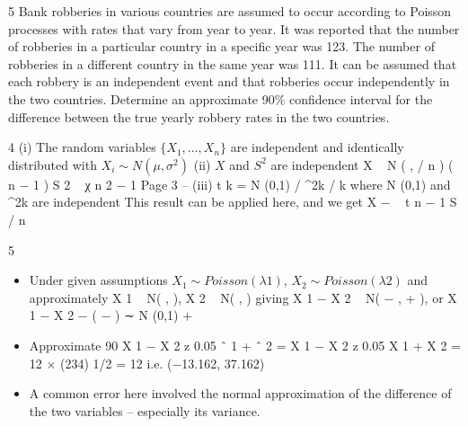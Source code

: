 \documentclass[a4paper,12pt]{article}
\begin{document}

\item 5
Bank robberies in various countries are assumed to occur according to Poisson
processes with rates that vary from year to year. It was reported that the number of robberies in a particular country in a specific year was 123. The number of robberies
in a different country in the same year was 111. It can be assumed that each robbery is an independent event and that robberies occur independently in the two countries.
Determine an approximate 90\% confidence interval for the difference between the true yearly robbery rates in the two countries.


4
(i)
The random variables $\{ X_1 , \ldots, X_n\}$  are independent
and identically distributed with $X_i \sim N ( \mu , \sigma^2 )$
(ii)
$X$ and $S^2$ are independent
X ~ N ( \mu ,  / n )
( n − 1 ) S 2
~ χ n 2 − 1
Page 3 – 
(iii)
t k = N (0,1) / \chi^2k / k where N (0,1) and \chi^2k are independent
This result can be applied here, and we get
X −\mu
~ t n − 1
S / n

5
\begin{itemize}
\item Under given assumptions $X_1 \sim Poisson(\lambda 1 )$, $X_2 \sim Poisson(\lambda 2 )$
and approximately
X 1 ~ N( ,  ), X 2 ~ N( ,  )
giving X 1 − X 2 ~ N( −  ,  +  ), or
X 1 − X 2 − (  −  )
∼ N (0,1)
 + 
\item Approximate 90%
X 1 − X 2 \pm z 0.05 \lambda ˆ 1 + \lambda ˆ 2 = X 1 − X 2 \pm z 0.05 X 1 + X 2
= 12  × (234) 1/2 = 12  i.e. (−13.162, 37.162)
\item A common error here involved the normal approximation of the difference of the two
variables – especially its variance.
\end{itemize}
\end{document}
